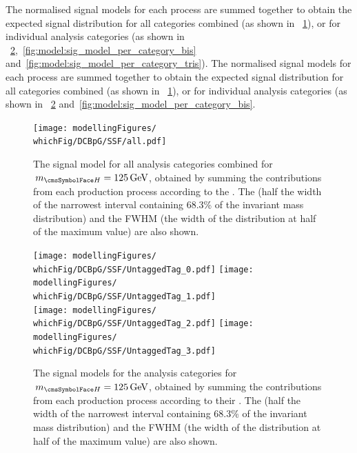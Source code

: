 \ifNewAnalysis
The normalised signal models for each process are summed together to obtain the expected signal \mgg distribution for all categories combined (as shown in \Fig\s~\ref{fig:model:sig_model_all}), or for individual analysis categories (as shown in \Fig\s~\ref{fig:model:sig_model_per_category},~\ref{fig:model:sig_model_per_category_bis} and~\ref{fig:model:sig_model_per_category_tris}).
\else
The normalised signal models for each process are summed together to obtain the expected signal \mgg distribution for all categories combined (as shown in \Fig\s~\ref{fig:model:sig_model_all}), or for individual analysis categories (as shown in \Fig\s~\ref{fig:model:sig_model_per_category} and~\ref{fig:model:sig_model_per_category_bis}.
\fi
\begin{figure}[ht!]
\centering
\texttt{[image: modellingFigures/\\whichFig/DCBpG/SSF/all.pdf]} 

\caption{The signal model for all analysis categories combined for $\mH=125\GeV$, obtained by summing the contributions from each production process according to the \effxacc. The \effSigma (half the width of the narrowest interval containing 68.3\% of the invariant mass distribution) and the FWHM (the width of the distribution at half of the maximum value) are also shown. }

\label{fig:model:sig_model_all}
\end{figure}

\begin{figure}[htp!]
\centering
\texttt{[image: modellingFigures/\\whichFig/DCBpG/SSF/UntaggedTag\_0.pdf]} 
\texttt{[image: modellingFigures/\\whichFig/DCBpG/SSF/UntaggedTag\_1.pdf]} \\
\texttt{[image: modellingFigures/\\whichFig/DCBpG/SSF/UntaggedTag\_2.pdf]} 
\texttt{[image: modellingFigures/\\whichFig/DCBpG/SSF/UntaggedTag\_3.pdf]} \\ 

\caption{The signal models for the \Untagged analysis categories for $\mH=125\GeV$, obtained by summing the contributions from each production process according to their \effxacc. The \effSigma (half the width of the narrowest interval containing 68.3\% of the invariant mass distribution) and the FWHM (the width of the distribution at half of the maximum value) are also shown.}

\label{fig:model:sig_model_per_category}
\end{figure}


